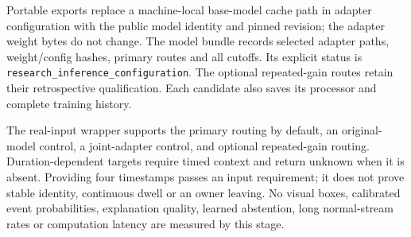 Portable exports replace a machine-local base-model cache path in adapter configuration with the public model identity and pinned revision; the adapter weight bytes do not change. The model bundle records selected adapter paths, weight/config hashes, primary routes and all cutoffs. Its explicit status is \texttt{research\_inference\_configuration}. The optional repeated-gain routes retain their retrospective qualification. Each candidate also saves its processor and complete training history.

The real-input wrapper supports the primary routing by default, an original-model control, a joint-adapter control, and optional repeated-gain routing. Duration-dependent targets require timed context and return unknown when it is absent. Providing four timestamps passes an input requirement; it does not prove stable identity, continuous dwell or an owner leaving. No visual boxes, calibrated event probabilities, explanation quality, learned abstention, long normal-stream rates or computation latency are measured by this stage.

